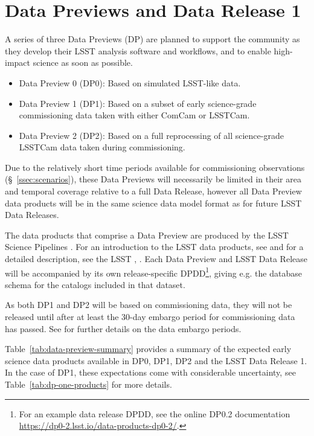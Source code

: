 \section{Data Previews and Data Release 1} 
\label{sec:datapreview}

A series of three Data Previews (DP) are planned to support the community as they develop their LSST analysis software and workflows, and to enable high-impact science as soon as possible.
\begin{itemize}
\item Data Preview 0 (DP0): Based on simulated LSST-like data.
\item Data Preview 1 (DP1): Based on a subset of early science-grade commissioning data taken with either ComCam or LSSTCam.
\item Data Preview 2 (DP2): Based on a full reprocessing of all science-grade LSSTCam data taken during commissioning.
\end{itemize}

Due to the relatively short time periods available for commissioning observations (\S~\ref{ssec:scenarios}), these Data Previews will necessarily be limited in their area and temporal coverage relative to a full Data Release, however all Data Preview data products will be in the same science data model format as for future LSST Data Releases.

The data products that comprise a Data Preview are produced by the LSST Science Pipelines \citep{2019ASPC..523..521B,2018PASJ...70S...5B}.
For an introduction to the LSST data products, see \citet{RubinDataProductsAbridged} and for a detailed description, see the LSST \dpdd{},  .
Each Data Preview and LSST Data Release will be accompanied by its own release-specific DPDD\footnote{For an example data release DPDD, see the online DP0.2 documentation {\url{https://dp0-2.lsst.io/data-products-dp0-2/}}.}, giving e.g. the  database schema for the catalogs included in that dataset.

As both DP1 and DP2 will be based on commissioning data, they will not be released until after at least the 30-day embargo period for commissioning data has passed.
See  for further details on the data embargo periods.

Table~\ref{tab:data-preview-summary} provides a summary of the expected early science data products available in DP0, DP1, DP2 and the LSST Data Release 1.
In the case of DP1, these expectations come with considerable uncertainty, see Table~\ref{tab:dp-one-products} for more details.

